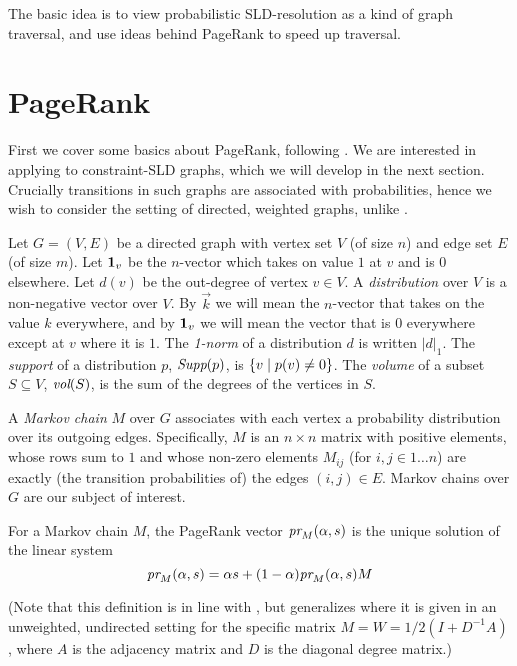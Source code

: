 \documentclass{article} %
\begin{document}
The basic idea is to view probabilistic SLD-resolution as a kind of graph traversal, and use ideas behind PageRank \cite{PageRank} to speed up traversal.

\section{PageRank}
First we cover some basics about PageRank, following \cite{Andersen-2006,Andersen-2008}. We are interested in applying to constraint-SLD graphs, which we will develop in the next section. Crucially transitions in such graphs are associated with probabilities, hence we wish to consider the setting of directed, weighted graphs, unlike \cite{Andersen-2006}.

Let $G=(V,E)$ be a directed graph with vertex set $V$ (of size $n$) and edge set $E$ (of size $m$). Let ${\bf 1}_v$ be the $n$-vector which takes on value $1$ at $v$ and is $0$ elsewhere. Let $d(v)$ be the out-degree of vertex $v\in V$. A {\em distribution} over $V$ is a non-negative vector over $V$. By $\vec{k}$ we will mean the $n$-vector that takes on the value $k$ everywhere, and by ${\bf 1}_v$ we will mean the vector that is $0$ everywhere except at $v$ where it is $1$. The {\em 1-norm} of a distribution $d$ is written $|d|_1$. The {\em support} of a distribution $p$, $\mbox{\em Supp}(p)$, is $\{v \alt p(v) \not= 0\}$. The {\em volume} of a subset $S \subseteq V$, $\mbox{\em vol}(S)$, is the sum of the degrees of the vertices in $S$. 

A {\em Markov chain} $M$ over $G$ associates with each vertex a probability distribution over its outgoing edges. Specifically, $M$ is an $n \times n$ matrix with positive elements, whose rows sum to $1$ and whose non-zero elements $M_{ij}$ (for $i,j\in 1\ldots n$) are exactly (the transition probabilities of) the edges $(i,j)\in E$. Markov chains over $G$ are our subject of interest.

\begin{definition} For a Markov chain $M$, the PageRank vector $\mbox{\em pr}_M(\alpha, s)$ is the unique solution of the linear system
\begin{equation}
\mbox{\em pr}_M(\alpha, s) = \alpha s + (1 - \alpha)\mbox{\em pr}_M(\alpha, s)M    
\end{equation}
\end{definition}
(Note that this definition is in line with \cite{Andersen-2008}, but generalizes \cite{Andersen-2006} where it is given in an unweighted, undirected setting for the specific matrix $M=W=1/2(I+ D^{-1}A)$, where $A$ is the adjacency matrix and $D$ is the diagonal degree matrix.)
\end{document}
